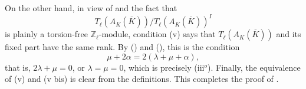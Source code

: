 On the other hand, in view of  and the fact that
\[
 T_\ell(A_K(\overline K))/T_\ell(A_K(\overline K))^I
\]
is plainly a torsion-free $\mathbb Z_\ell$-module, condition (v) says
that $T_\ell(A_K(\overline K))$ and its fixed part have the same rank.
By () and (), this is the condition
\[
 \mu+2\alpha=2(\lambda+\mu+\alpha),
\]
that is, $2\lambda+\mu=0$, or $\lambda=\mu=0$, which is precisely
(iii$^o$).  Finally, the equivalence of (v) and (v bis) is clear from
the definitions.  This completes the proof of .
